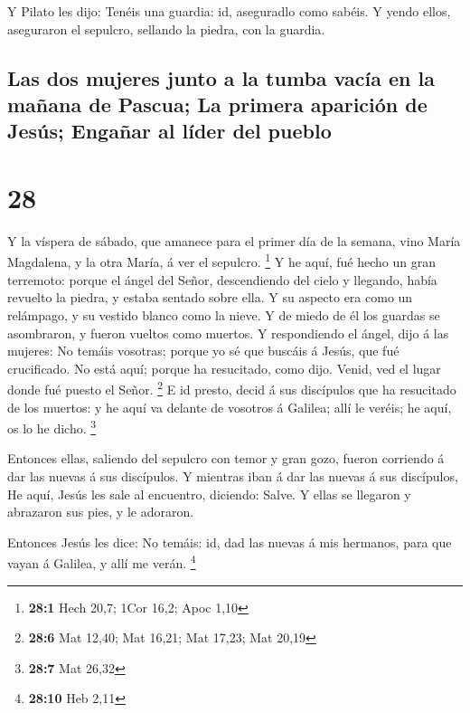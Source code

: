  Y Pilato les dijo: Tenéis una guardia: id, aseguradlo como
sabéis.  Y yendo ellos, aseguraron el sepulcro, sellando la
piedra, con la guardia.

\hypertarget{las-dos-mujeres-junto-a-la-tumba-vacuxeda-en-la-mauxf1ana-de-pascua-la-primera-apariciuxf3n-de-jesuxfas-engauxf1ar-al-luxedder-del-pueblo}{%
\subsection{Las dos mujeres junto a la tumba vacía en la mañana de
Pascua; La primera aparición de Jesús; Engañar al líder del
pueblo}\label{las-dos-mujeres-junto-a-la-tumba-vacuxeda-en-la-mauxf1ana-de-pascua-la-primera-apariciuxf3n-de-jesuxfas-engauxf1ar-al-luxedder-del-pueblo}}

\hypertarget{section-27}{%
\section{28}\label{section-27}}

 Y la víspera de sábado, que amanece para el primer día de
la semana, vino María Magdalena, y la otra María, á ver el sepulcro.
\footnote{\textbf{28:1} Hech 20,7; 1Cor 16,2; Apoc 1,10}  Y
he aquí, fué hecho un gran terremoto: porque el ángel del Señor,
descendiendo del cielo y llegando, había revuelto la piedra, y estaba
sentado sobre ella.  Y su aspecto era como un relámpago, y
su vestido blanco como la nieve.  Y de miedo de él los
guardas se asombraron, y fueron vueltos como muertos.  Y
respondiendo el ángel, dijo á las mujeres: No temáis vosotras; porque yo
sé que buscáis á Jesús, que fué crucificado.  No está aquí;
porque ha resucitado, como dijo. Venid, ved el lugar donde fué puesto el
Señor. \footnote{\textbf{28:6} Mat 12,40; Mat 16,21; Mat 17,23; Mat
  20,19}  E id presto, decid á sus discípulos que ha
resucitado de los muertos: y he aquí va delante de vosotros á Galilea;
allí le veréis; he aquí, os lo he dicho. \footnote{\textbf{28:7} Mat
  26,32}

 Entonces ellas, saliendo del sepulcro con temor y gran
gozo, fueron corriendo á dar las nuevas á sus discípulos. Y mientras
iban á dar las nuevas á sus discípulos,  He aquí, Jesús les
sale al encuentro, diciendo: Salve. Y ellas se llegaron y abrazaron sus
pies, y le adoraron.

 Entonces Jesús les dice: No temáis: id, dad las nuevas á
mis hermanos, para que vayan á Galilea, y allí me verán. \footnote{\textbf{28:10}
  Heb 2,11}

